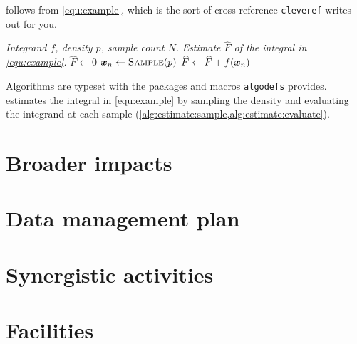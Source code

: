 \documentclass[10pt]{article}
\begin{document}
 follows from \cref{equ:example}, which is the sort of cross-reference \texttt{cleveref} writes out for you.

\begin{algorithm}[b]
	\caption{$(f, p, N)$}
	\label{alg:estimate}
	\begin{algorithmic}[1]
		\Require \textit{Integrand $f$, density $p$, sample count $N$.}
		\Ensure \textit{Estimate $\widehat{F}$ of the integral in \cref{equ:example}.}
		\State $\widehat{F} \gets 0$
			\ENDCOMMENT
			\State $\bm{x}_n \gets \mbox{\textsc{Sample}}(p)$ \label{alg:estimate:sample}
			\ENDCOMMENT
			\State $\widehat{F} \gets \widehat{F} + f \lparen\bm{x}_n\rparen$ \label{alg:estimate:evaluate}
		\ENDFORDO
		\RETURN[$\widehat{F} / N$]\ENDRETURN
	\end{algorithmic}
\end{algorithm}

Algorithms are typeset with the packages and macros \texttt{algodefs} provides.  estimates the integral in \cref{equ:example} by sampling the density and evaluating the integrand at each sample (\cref{alg:estimate:sample,alg:estimate:evaluate}).

\section{Broader impacts}\label{sec:impact}

%
\clearpage
\setcounter{page}{1}

\section*{Data management plan}

%
\clearpage
\setcounter{page}{1}

\section*{Synergistic activities}

%
\clearpage
\setcounter{page}{1}

\section*{Facilities}
\end{document}
